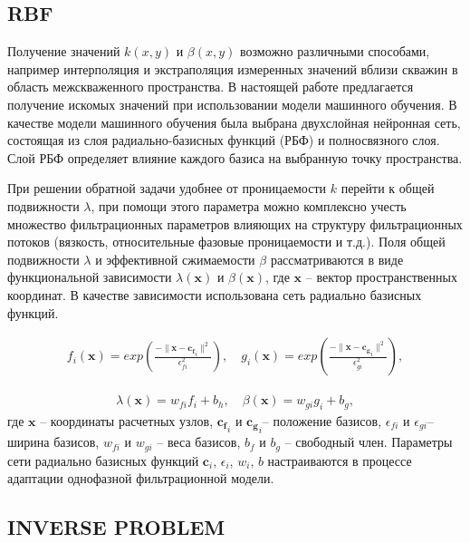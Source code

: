 \documentclass{article}
\begin{document}
\subsection{RBF}

Получение значений $k(x,y)$ и $\beta(x,y)$ возможно различными способами, например интерполяция и экстраполяция измеренных значений вблизи скважин в область межскваженного пространства. В настоящей работе предлагается получение искомых значений при использовании модели машинного обучения. В качестве модели машинного обучения была выбрана двухслойная нейронная сеть, состоящая из слоя радиально-базисных функций (РБФ) и полносвязного слоя. Слой РБФ определяет влияние каждого базиса на выбранную точку пространства.

При решении обратной задачи удобнее от проницаемости $k$ перейти к общей подвижности $\lambda$, при помощи этого параметра можно комплексно учесть множество фильтрационных параметров влияющих на структуру фильтрационных потоков (вязкость, относительные фазовые проницаемости и т.д.). 
Поля общей подвижности $\lambda$ и эффективной сжимаемости $\beta$ рассматриваются в виде функциональной зависимости $\lambda(\mathbf{x})$ и $\beta(\mathbf{x})$, где  $\mathbf{x}$ – вектор пространственных координат. В качестве зависимости использована сеть радиально базисных функций.

\begin{eqnarray}\label{rbf}
	f_i(\mathbf{x}) = exp \left(\frac{-\lVert \mathbf{x} - \mathbf{c_f}_i \rVert^2}{\epsilon_{fi}^2}\right), \quad
	g_i(\mathbf{x}) = exp \left(\frac{-\lVert \mathbf{x} - \mathbf{c_g}_i \rVert^2}{\epsilon_{gi}^2}\right),
\end{eqnarray}

\begin{eqnarray}
	\lambda(\mathbf{x}) = w_{fi}f_i + b_h, \quad
	\beta(\mathbf{x}) = w_{gi}g_i + b_g,
\end{eqnarray}
где $\mathbf{x}$ – координаты расчетных узлов,  $\mathbf{c_f}_i$ и $\mathbf{c_g}_i$– положение базисов, $\epsilon_{fi}$ и $\epsilon_{gi}$– ширина базисов, $w_{fi}$ и $w_{gi}$ – веса базисов, $b_f$ и $b_g$ – свободный член. Параметры сети радиально базисных функций $\mathbf{c}_i$, $\epsilon_i$, $w_i$, $b$  настраиваются в процессе адаптации однофазной фильтрационной модели.

\subsection{INVERSE PROBLEM}
\end{document}
